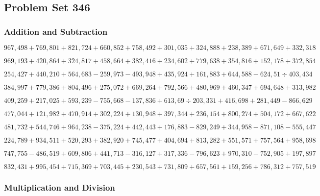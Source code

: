 \hypertarget{problem-set-346}{%
\subsection{Problem Set 346}\label{problem-set-346}}

\hypertarget{addition-and-subtraction}{%
\subsubsection{Addition and
Subtraction}\label{addition-and-subtraction}}

\(967,498+769,801+821,724+660,852+758,492+301,035+324,888+238,389+671,649+332,318\)

\(969,193+420,864+324,817+458,664+382,416+234,602+779,638+354,816+152,178+372,854\)

\(254,427+440,210+564,683-259,973-493,948+435,924+161,883+644,588-624,51÷403,434\)

\(384,997+779,386+804,496+275,072+669,264+792,566+480,969+460,347+694,648+313,982\)

\(409,259+217,025+593,239-755,668-137,836+613,69÷203,331+416,698+281,449-866,629\)

\(477,044+121,982+470,914+302,224+130,948+397,344+236,154+800,274+504,172+667,622\)

\(481,732+544,746+964,238-375,224+442,443+176,883-829,249+344,958-871,108-555,447\)

\(224,789+934,511+520,293+382,920+745,477+404,694+813,282+551,571+757,564+958,698\)

\(747,755-486,519+609,806+441,713-316,127+317,336-796,623+970,310-752,905+197,897\)

\(832,431+995,454+715,369+703,445+230,543+731,809+657,561+159,256+786,312+757,519\)

\hypertarget{multiplication-and-division}{%
\subsubsection{Multiplication and
Division}\label{multiplication-and-division}}

